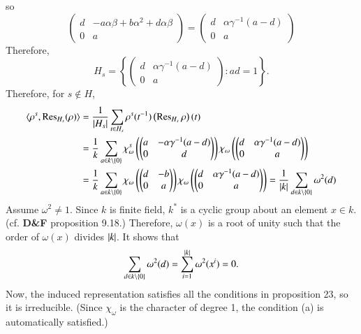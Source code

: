 \documentclass[a4paper, 12pt]{article}
\theoremstyle{Mydefinition}
\theoremstyle{Mytheorem}
\begin{document}
so
\begin{equation}
    \begin{pmatrix}
    d & -a\alpha\beta + b\alpha^2+d\alpha\beta\\
    0 & a
    \end{pmatrix} = \begin{pmatrix}
    d & \alpha\gamma^{-1}(a-d)\\
    0 & a
    \end{pmatrix}
\end{equation}
Therefore, 
\begin{equation}
    H_s = \left\{\begin{pmatrix}
    d & \alpha\gamma^{-1}(a-d) \\ 0 & a
    \end{pmatrix}:ad=1\right\}.
\end{equation}
Therefore, for $s\not\in H$,
\begin{equation}
\begin{split}
    \langle \rho^s, \Res_{H_s}(\rho) \rangle &= \frac{1}{\abs{H_s}}\sum_{t\in H_s}\rho^s(t^{-1})\left(\Res_{H_s}\rho\right)(t) \\
    &=\frac{1}{k}\sum_{a\in k\setminus\{0\}}\chi_\omega^s\left(\begin{pmatrix}
    a & -\alpha\gamma^{-1}(a-d)\\ 0 & d
    \end{pmatrix}\right)\chi_\omega\left(\begin{pmatrix}
    d & \alpha\gamma^{-1}(a-d) \\ 0 & a
    \end{pmatrix}\right)\\
    &=\frac{1}{k}\sum_{a\in k\setminus\{0\}}\chi_\omega\left(\begin{pmatrix}
    d & -b\\ 0 & a
    \end{pmatrix}\right)\chi_\omega\left(\begin{pmatrix}
    d & \alpha\gamma^{-1}(a-d) \\ 0 & a
    \end{pmatrix}\right) = \frac{1}{\abs{k}}\sum_{d\in k\setminus\{0\}}\omega^2(d)
\end{split} 
\end{equation}
Assume $\omega^2\neq 1$. Since $k$ is finite field, $k^*$ is a cyclic group about an element $x\in k$. (cf. \textbf{D\&F} proposition 9.18.) Therefore, $\omega(x)$ is a root of unity such that the order of $\omega(x)$ divides $\abs{k}$. It shows that
\begin{equation}
    \sum_{d\in k\setminus\{0\}}\omega^2(d) = \sum_{i=1}^{\abs{k}}\omega^2(x^i) = 0.
\end{equation}
Now, the induced representation satisfies all the conditions in proposition 23, so it is irreducible. (Since $\chi_\omega$ is the character of degree 1, the condition (a) is automatically satisfied.)
\end{document}
